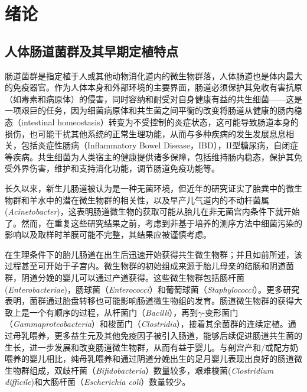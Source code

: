 
\chapter{绪论}
\label{chap:introduction}

\section{人体肠道菌群及其早期定植特点}
肠道菌群是指定植于人或其他动物消化道内的微生物群落，人体肠道也是体内最大的免疫器官。作为人体本身和外部环境的主要界面，肠道必须保护其免收有害抗原（如毒素和病原体）的侵害，同时容纳和耐受对自身健康有益的共生细菌——这是一项艰巨的任务，因为细菌病原体和共生菌之间平衡的改变将肠道从健康的肠内稳态（intestinal homeostasis）\cite{collier2005innate}转变为不受控制的炎症状态，这可能导致肠道本身的损伤，也可能干扰其他系统的正常生理功能，从而与多种疾病的发生发展息息相关，包括炎症性肠病（Inflammatory Bowel Disease，IBD）\cite{ni2017gut}，II型糖尿病\cite{harsch2018role}，自闭症\cite{de2014altered, de2013fecal}等疾病。共生细菌为人类宿主的健康提供诸多保障，包括维持肠内稳态\cite{hooper2001commensal}，保护其免受外界伤害\cite{rakoff2004recognition}，维护和支持消化功能\cite{guarner2006mechanisms}，调节肠道免疫功能\cite{round2009gut,abreu2010toll}等。

长久以来，新生儿肠道被认为是一种无菌环境，但近年的研究证实了胎粪中的微生物群和羊水中的潜在微生物群的相关性\cite{ardissone2014meconium}，以及早产儿气道内的不动杆菌属(\textit{Acinetobacter})\cite{lohmann2014airway}，这表明肠道微生物的获取可能从胎儿在非无菌宫内条件下就开始了。然而，在重复这些研究结果之前，考虑到非基于培养的测序方法\cite{pennisi2014our}中细菌污染的影响以及取样时羊膜可能不完整，其结果应被谨慎考虑。

在生理条件下的胎儿肠道在出生后迅速开始获得共生微生物群；并且如前所述，该过程甚至可开始于子宫内。微生物群的初始组成来源于胎儿母亲的结肠和阴道菌群，阴道分娩的婴儿可以通过产道获得。这些微生物群包括肠杆菌(\textit{Enterobacteriae})，肠球菌（\textit{Enterococci}）和葡萄球菌（\textit{Staphylococci}）\cite{backhed2005host}。更多研究表明，菌群通过胎盘转移也可能影响肠道微生物组的发育\cite{aagaard2014placenta}。肠道微生物群的获得大致上是一个有顺序的过程，从杆菌门（\textit{Bacilli}），再到$\gamma$-变形菌门（\textit{Gammaproteobacteria}）和梭菌门（\textit{Clostridia}），接着其余菌群的连续定植\cite{la2014patterned}。通过母乳喂养，更多益生元及其他免疫因子被引入肠道，能够后续促进肠道共生菌的生长，进一步发展和改变肠道微生物群，从而有益于婴儿​​\cite{ouwehand2005prebiotics}。与剖宫产和/或配方奶喂养的婴儿相比，纯母乳喂养和通过阴道分娩出生的足月婴儿表现出良好的肠道微生物群组成，双歧杆菌（\textit{Bifidobacteria}）数量较多，艰难梭菌(\textit{Clostridium difficile})和大肠杆菌（\textit{Escherichia coli}）数量较少\cite{demehri2013hirschsprung}。

